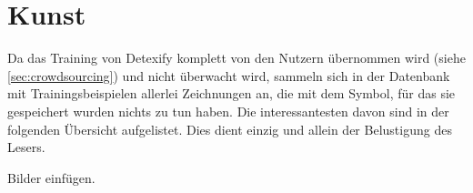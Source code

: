 \chapter{Kunst}
\label{cha:kunst}

Da das Training von Detexify komplett von den Nutzern übernommen wird (siehe \ref{sec:crowdsourcing}) und nicht überwacht wird, sammeln sich in der Datenbank mit Trainingsbeispielen allerlei Zeichnungen an, die mit dem Symbol, für das sie gespeichert wurden nichts zu tun haben. Die interessantesten davon sind in der folgenden Übersicht aufgelistet. Dies dient einzig und allein der Belustigung des Lesers.

\TODO Bilder einfügen.